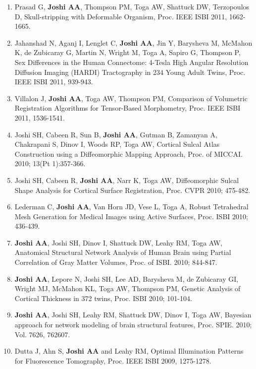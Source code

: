 \documentclass[overlapped,line,letterpaper]{res}
\begin{document}
\begin{resume}
\begin{enumerate}
    \item Prasad G, \textbf{Joshi AA}, Thompson PM, Toga AW, Shattuck DW, Terzopoulos D, {Skull-stripping with Deformable Organism}, Proc. IEEE ISBI 2011, 1662-1665. 

    \item Jahanshad N, Aganj I, Lenglet C, \textbf{Joshi AA}, Jin Y, Barysheva M, McMahon K, de Zubicaray G, Martin N, Wright M, Toga A, Sapiro G, Thompson P, {Sex Differences in the Human Connectome: 4-Tesla High Angular Resolution Diffusion Imaging (HARDI) Tractography in 234 Young Adult Twins}, Proc. IEEE ISBI 2011, 939-943.

    \item Villalon J, \textbf{Joshi AA}, Toga AW, Thompson PM, {Comparison of Volumetric Registration Algorithms for Tensor-Based Morphometry}, Proc. IEEE ISBI 2011, 1536-1541. 

    \item Joshi SH, Cabeen R, Sun B, \textbf{Joshi AA}, Gutman B, Zamanyan A, Chakrapani S, Dinov I, Woods RP, Toga AW, {Cortical Sulcal Atlas Construction using a Diffeomorphic Mapping Approach}, Proc. of MICCAI. 2010; 13(Pt 1):357-366.

    \item Joshi SH, Cabeen R, \textbf{Joshi AA}, Narr K, Toga AW, {Diffeomorphic Sulcal Shape Analysis for Cortical Surface Registration}, Proc. CVPR 2010; 475-482.

    \item Lederman C, \textbf{Joshi AA}, Van Horn JD, Vese L, Toga A, {Robust Tetrahedral Mesh Generation for Medical Images using Active Surfaces}, Proc. ISBI 2010; 436-439.

    \item \textbf{Joshi AA}, Joshi SH, Dinov I, Shattuck DW, Leahy RM, Toga AW, {Anatomical Structural Network Analysis of Human Brain using Partial Correlation of Gray Matter Volumes}, Proc. of ISBI. 2010; 844-847.

    \item \textbf{Joshi AA}, Lepore N, Joshi SH, Lee AD, Barysheva M, de Zubicaray GI, Wright MJ, McMahon KL, Toga AW, Thompson PM, {Genetic Analysis of Cortical Thickness in 372 twins}, Proc. ISBI 2010; 101-104.

    \item \textbf{Joshi AA}, Joshi SH, Leahy RM, Shattuck DW, Dinov I, Toga AW, {Bayesian approach for network modeling of brain structural features}, Proc. SPIE. 2010; Vol. 7626, 762607.

    \item Dutta J, Ahn S, \textbf{Joshi AA} and Leahy RM, {Optimal Illumination Patterns for Fluorescence Tomography}, Proc. IEEE ISBI 2009, 1275-1278.


\end{enumerate}
\end{resume}
\end{document}
